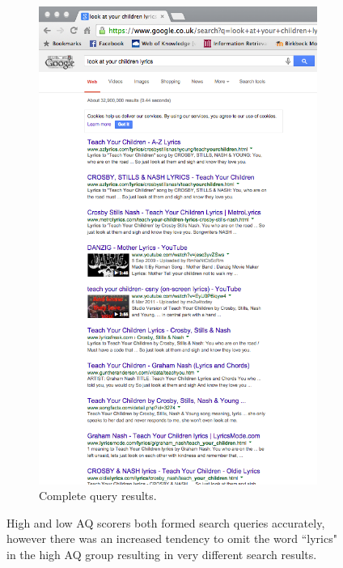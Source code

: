 \documentclass[a4paper, 11pt]{article}
\begin{document}
\begin{enumerate}
{\begin{figure}[H]
\begin{subfigure}{.5\textwidth}
  \includegraphics[width=.7\linewidth]{lookAtUrChildrenLyrics}
  \caption{Complete query results.}
\end{subfigure}
\caption{High and low AQ scorers both formed search queries accurately, however there was an increased tendency to omit the word ``lyrics" in the high AQ group resulting in very different search results.}
\label{someresults}
\end{figure}

}
\end{enumerate}
\end{document}
